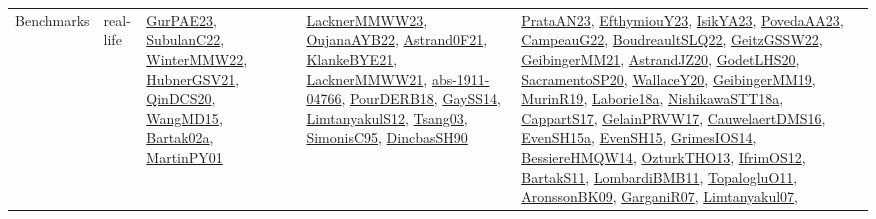 {\begin{longtable}{lp{3cm}>{\raggedright}p{6cm}>{\raggedright}p{6cm}p{8cm}}
Benchmarks & real-life & \href{articles/GurPAE23.pdf}{GurPAE23}\cite{GurPAE23}, \href{articles/SubulanC22.pdf}{SubulanC22}\cite{SubulanC22}, \href{papers/WinterMMW22.pdf}{WinterMMW22}\cite{WinterMMW22}, \href{articles/HubnerGSV21.pdf}{HubnerGSV21}\cite{HubnerGSV21}, \href{articles/QinDCS20.pdf}{QinDCS20}\cite{QinDCS20}, \href{articles/WangMD15.pdf}{WangMD15}\cite{WangMD15}, \href{papers/Bartak02a.pdf}{Bartak02a}\cite{Bartak02a}, \href{articles/MartinPY01.pdf}{MartinPY01}\cite{MartinPY01} & \href{articles/LacknerMMWW23.pdf}{LacknerMMWW23}\cite{LacknerMMWW23}, \href{papers/OujanaAYB22.pdf}{OujanaAYB22}\cite{OujanaAYB22}, \href{papers/Astrand0F21.pdf}{Astrand0F21}\cite{Astrand0F21}, \href{papers/KlankeBYE21.pdf}{KlankeBYE21}\cite{KlankeBYE21}, \href{papers/LacknerMMWW21.pdf}{LacknerMMWW21}\cite{LacknerMMWW21}, \href{articles/abs-1911-04766.pdf}{abs-1911-04766}\cite{abs-1911-04766}, \href{articles/PourDERB18.pdf}{PourDERB18}\cite{PourDERB18}, \href{papers/GaySS14.pdf}{GaySS14}\cite{GaySS14}, \href{articles/LimtanyakulS12.pdf}{LimtanyakulS12}\cite{LimtanyakulS12}, \href{articles/Tsang03.pdf}{Tsang03}\cite{Tsang03}, \href{papers/SimonisC95.pdf}{SimonisC95}\cite{SimonisC95}, \href{articles/DincbasSH90.pdf}{DincbasSH90}\cite{DincbasSH90} & \href{articles/PrataAN23.pdf}{PrataAN23}\cite{PrataAN23}, \href{papers/EfthymiouY23.pdf}{EfthymiouY23}\cite{EfthymiouY23}, \href{articles/IsikYA23.pdf}{IsikYA23}\cite{IsikYA23}, \href{papers/PovedaAA23.pdf}{PovedaAA23}\cite{PovedaAA23}, \href{articles/CampeauG22.pdf}{CampeauG22}\cite{CampeauG22}, \href{papers/BoudreaultSLQ22.pdf}{BoudreaultSLQ22}\cite{BoudreaultSLQ22}, \href{papers/GeitzGSSW22.pdf}{GeitzGSSW22}\cite{GeitzGSSW22}, \href{papers/GeibingerMM21.pdf}{GeibingerMM21}\cite{GeibingerMM21}, \href{articles/AstrandJZ20.pdf}{AstrandJZ20}\cite{AstrandJZ20}, \href{papers/GodetLHS20.pdf}{GodetLHS20}\cite{GodetLHS20}, \href{articles/SacramentoSP20.pdf}{SacramentoSP20}\cite{SacramentoSP20}, \href{articles/WallaceY20.pdf}{WallaceY20}\cite{WallaceY20}, \href{papers/GeibingerMM19.pdf}{GeibingerMM19}\cite{GeibingerMM19}, \href{papers/MurinR19.pdf}{MurinR19}\cite{MurinR19}, \href{papers/Laborie18a.pdf}{Laborie18a}\cite{Laborie18a}, \href{papers/NishikawaSTT18a.pdf}{NishikawaSTT18a}\cite{NishikawaSTT18a}, \href{papers/CappartS17.pdf}{CappartS17}\cite{CappartS17}, \href{papers/GelainPRVW17.pdf}{GelainPRVW17}\cite{GelainPRVW17}, \href{papers/CauwelaertDMS16.pdf}{CauwelaertDMS16}\cite{CauwelaertDMS16}, \href{articles/EvenSH15a.pdf}{EvenSH15a}\cite{EvenSH15a}, \href{papers/EvenSH15.pdf}{EvenSH15}\cite{EvenSH15}, \href{articles/GrimesIOS14.pdf}{GrimesIOS14}\cite{GrimesIOS14}, \href{papers/BessiereHMQW14.pdf}{BessiereHMQW14}\cite{BessiereHMQW14}, \href{articles/OzturkTHO13.pdf}{OzturkTHO13}\cite{OzturkTHO13}, \href{papers/IfrimOS12.pdf}{IfrimOS12}\cite{IfrimOS12}, \href{articles/BartakS11.pdf}{BartakS11}\cite{BartakS11}, \href{papers/LombardiBMB11.pdf}{LombardiBMB11}\cite{LombardiBMB11}, \href{articles/TopalogluO11.pdf}{TopalogluO11}\cite{TopalogluO11}, \href{papers/AronssonBK09.pdf}{AronssonBK09}\cite{AronssonBK09}, \href{papers/GarganiR07.pdf}{GarganiR07}\cite{GarganiR07}, \href{papers/Limtanyakul07.pdf}{Limtanyakul07}\cite{Limtanyakul07}, 
\end{longtable}}
